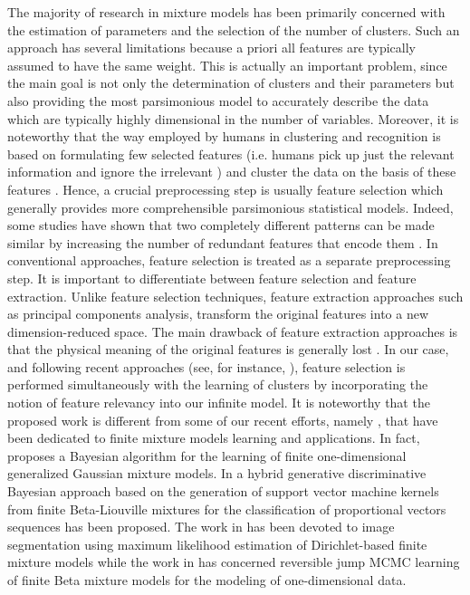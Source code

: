 \documentclass[journal,10pt]{elsart}
\begin{document}
The majority of research in mixture models has been primarily concerned with the estimation of parameters and the selection of the number of clusters. Such an approach has several limitations because a priori all features are typically assumed to have the same weight. This is actually an important problem, since the main goal is not only the determination of clusters and their parameters but also providing the most parsimonious model to accurately describe the data which are typically highly dimensional in the number of variables. Moreover, it is noteworthy that the way employed by humans in clustering and recognition is based on formulating few selected features (i.e. humans pick up just the relevant information and ignore the irrelevant \cite{Khardon1997}) and cluster the data on the basis of these features \cite{Cardie2000}. Hence, a crucial preprocessing step is usually feature selection which generally provides more comprehensible parsimonious statistical models. Indeed, some studies have shown that two completely different patterns can be made similar by increasing the number of redundant features that encode them \cite{Watanabe1985}. In conventional approaches, feature selection is treated as a separate preprocessing step. It is important to differentiate between feature selection and feature extraction. Unlike feature selection techniques, feature extraction approaches such as principal components analysis, transform the original features into a new dimension-reduced space. The main drawback of feature extraction approaches is that the physical meaning of the original features is generally lost \cite{Wei2007}. In our case, and following recent approaches (see, for instance, \cite{Law2004,Boutmedjet2009,Li2009,Allili2010}), feature selection is performed simultaneously with the learning of clusters by incorporating the notion of feature relevancy into our infinite model. It is noteworthy that the proposed work is different from some of our recent efforts, namely \cite{Guebaly2011,DBLP:journals/pr/Bouguila11,DBLP:journals/eswa/SefidpourB12,DBLP:journals/eswa/BouguilaE12}, that have been dedicated to finite mixture models learning and applications. In fact,  \cite{Guebaly2011} proposes a Bayesian algorithm for the learning of finite one-dimensional generalized Gaussian mixture models. In \cite{DBLP:journals/pr/Bouguila11} a hybrid generative discriminative Bayesian approach based on the generation of support vector machine kernels from finite Beta-Liouville mixtures for the classification of proportional vectors sequences has been proposed. The work in \cite{DBLP:journals/eswa/SefidpourB12} has been devoted to image segmentation using maximum likelihood estimation of Dirichlet-based finite mixture models while the work in \cite{DBLP:journals/eswa/BouguilaE12} has concerned reversible jump MCMC learning of finite Beta mixture models for the modeling of one-dimensional data.\\
\end{document}
